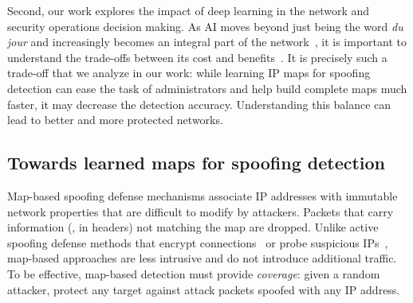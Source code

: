 Second, our work explores the impact of deep learning in the network and security operations decision making. As AI moves beyond just being the word {\em du jour} and increasingly becomes an integral part of the network~\citep{dls}, it is important to understand the trade-offs between its cost and benefits~\citep{vern}.
%
It is precisely such a trade-off that we analyze in our work: while learning IP maps for spoofing detection can ease the task of administrators and help build complete maps much faster, it may decrease the detection accuracy. Understanding this balance can lead to better and more protected networks.


\subsection{Towards learned maps for spoofing detection}


Map-based spoofing defense mechanisms associate IP addresses with immutable network properties that are difficult to modify by attackers. Packets that carry information (\ie{}, in headers) not matching the map are dropped. Unlike active spoofing defense methods that encrypt connections~\citep{ipsec} or probe suspicious IPs~\citep{puzzles}, map-based approaches are less intrusive and do not introduce additional traffic.
%
To be effective, map-based detection must provide {\em coverage}: given a random attacker, protect any target against attack packets spoofed with any IP address.
%

